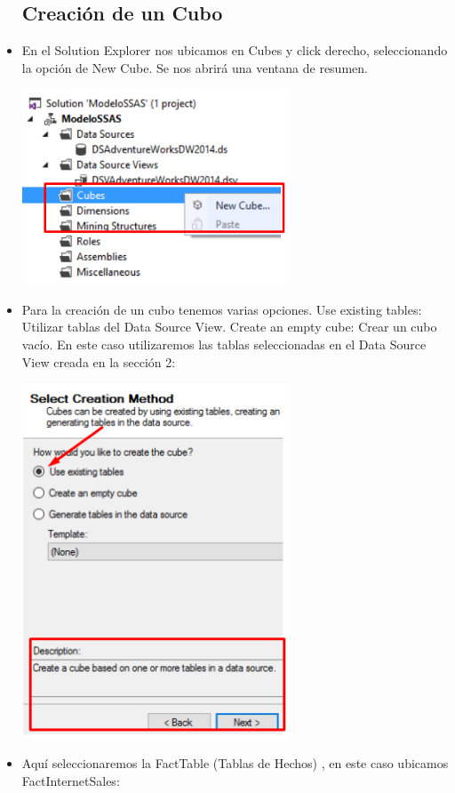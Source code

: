 \begin{itemize}
\subsection{Creación de un Cubo}

	 \item En el Solution Explorer nos ubicamos en Cubes y click derecho, seleccionando la opción de New Cube. Se nos abrirá una ventana de resumen.
	\begin{center}
	\includegraphics[width=8cm]{./Imagenes/img15}
	\end{center}
	 \item Para la creación de un cubo tenemos varias opciones. Use existing tables: Utilizar tablas del Data Source View. Create an empty cube: Crear un cubo vacío. En este caso utilizaremos las tablas seleccionadas en el Data Source View creada en la sección 2:
	\begin{center}
	\includegraphics[width=8cm]{./Imagenes/img17}
	\end{center}
	 \item Aquí seleccionaremos la FactTable (Tablas de Hechos) , en este caso ubicamos FactInternetSales:

\end{itemize}
